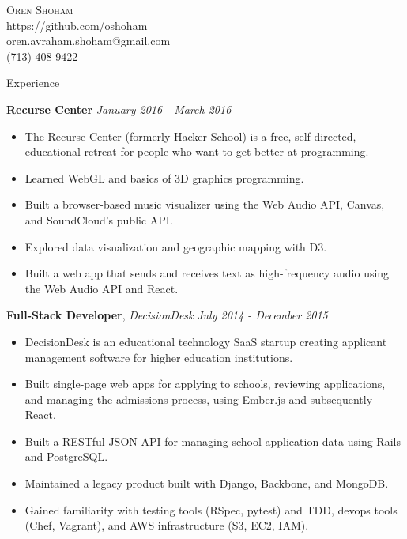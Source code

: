 \documentclass[9pt]{article}
\newenvironment{changemargin}[2]{%
  \begin{list}{}{%
    \setlength{\topsep}{0pt}%
    \setlength{\leftmargin}{#1}%
    \setlength{\rightmargin}{#2}%
    \setlength{\listparindent}{\parindent}%
    \setlength{\itemindent}{\parindent}%
    \setlength{\parsep}{\parskip}%
  }%
  \item[]}{\end{list}
}
\newcommand{\lineover}{
	\begin{changemargin}{-0.05in}{-0.05in}
		\vspace*{-8pt}
		\hrulefill \\
		\vspace*{-2pt}
	\end{changemargin}
}
\newcommand{\header}[1]{
	\begin{changemargin}{-0.5in}{-0.5in}
		\scshape{#1}\\
  	\lineover
	\end{changemargin}
}
\newcommand{\contact}[5]{
	\begin{changemargin}{-0.5in}{-0.5in}
		\begin{center}
			{\Large \scshape {#1}}\\ \smallskip
			{#2}\\ \smallskip 
			{#3}\\ \smallskip
			{#4}\smallskip
		\end{center}
	\end{changemargin}
}
\newenvironment{body} {
	\vspace*{-16pt}
	\begin{changemargin}{-0.25in}{-0.5in}
  }	
	{\end{changemargin}
}
\begin{document}

\contact{Oren Shoham}{https://github.com/oshoham}{oren.avraham.shoham@gmail.com}{(713) 408-9422}



\header{Experience}

\begin{body}
	\vspace{14pt}

	\textbf{Recurse Center} \hfill  \emph{January 2016 - March 2016}\\
	\vspace*{-4pt}
	\begin{itemize} \itemsep -0pt  %
		\item The Recurse Center (formerly Hacker School) is a free, self-directed, educational retreat for people who want to get better at programming.
		\item Learned WebGL and basics of 3D graphics programming.
		\item Built a browser-based music visualizer using the Web Audio API, Canvas, and SoundCloud's public API.
		\item Explored data visualization and geographic mapping with D3.
		\item Built a web app that sends and receives text as high-frequency audio using the Web Audio API and React.
	\end{itemize}

	\textbf{Full-Stack Developer}, \emph{DecisionDesk} \hfill \emph{July 2014 - December 2015}\\
	\vspace*{-4pt}
	\begin{itemize} \itemsep -0pt  %
		\item DecisionDesk is an educational technology SaaS startup creating applicant management software for higher education institutions.
		\item Built single-page web apps for applying to schools, reviewing applications, and managing the admissions process, using Ember.js and subsequently React.
		\item Built a RESTful JSON API for managing school application data using Rails and PostgreSQL.
		\item Maintained a legacy product built with Django, Backbone, and MongoDB.
		\item Gained familiarity with testing tools (RSpec, pytest) and TDD, devops tools (Chef, Vagrant),  and AWS infrastructure (S3, EC2, IAM).
	\end{itemize}


\end{body}
\end{document}
